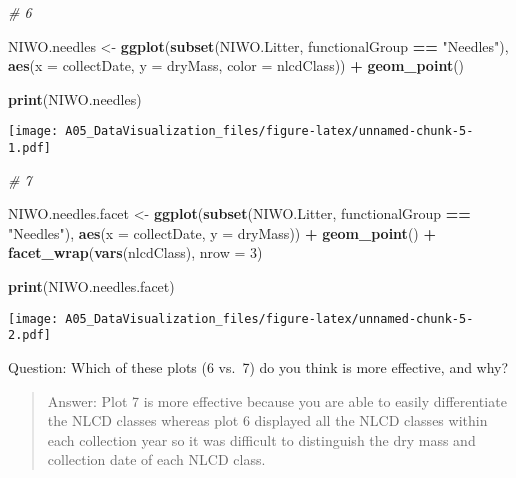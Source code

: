 \documentclass[]{article}
\newenvironment{Shaded}{\begin{snugshade}}{\end{snugshade}}
\newcommand{\KeywordTok}[1]{\textcolor[rgb]{0.13,0.29,0.53}{\textbf{#1}}}
\newcommand{\DataTypeTok}[1]{\textcolor[rgb]{0.13,0.29,0.53}{#1}}
\newcommand{\DecValTok}[1]{\textcolor[rgb]{0.00,0.00,0.81}{#1}}
\newcommand{\StringTok}[1]{\textcolor[rgb]{0.31,0.60,0.02}{#1}}
\newcommand{\CommentTok}[1]{\textcolor[rgb]{0.56,0.35,0.01}{\textit{#1}}}
\newcommand{\OperatorTok}[1]{\textcolor[rgb]{0.81,0.36,0.00}{\textbf{#1}}}
\newcommand{\NormalTok}[1]{#1}
\begin{document}
\begin{Shaded}
\begin{Highlighting}[]
\CommentTok{# 6}

\NormalTok{NIWO.needles <-}\StringTok{ }
\StringTok{  }\KeywordTok{ggplot}\NormalTok{(}\KeywordTok{subset}\NormalTok{(NIWO.Litter, functionalGroup }\OperatorTok{==}\StringTok{ "Needles"}\NormalTok{),}
         \KeywordTok{aes}\NormalTok{(}\DataTypeTok{x =}\NormalTok{ collectDate, }\DataTypeTok{y =}\NormalTok{ dryMass, }\DataTypeTok{color =}\NormalTok{ nlcdClass)) }\OperatorTok{+}
\StringTok{  }\KeywordTok{geom_point}\NormalTok{() }

 \KeywordTok{print}\NormalTok{(NIWO.needles)}
\end{Highlighting}
\end{Shaded}

\texttt{[image: A05\_DataVisualization\_files/figure-latex/unnamed-chunk-5-1.pdf]}

\begin{Shaded}
\begin{Highlighting}[]
\CommentTok{# 7}
 
\NormalTok{ NIWO.needles.facet <-}\StringTok{ }
\StringTok{   }\KeywordTok{ggplot}\NormalTok{(}\KeywordTok{subset}\NormalTok{(NIWO.Litter, functionalGroup }\OperatorTok{==}\StringTok{ "Needles"}\NormalTok{),}
         \KeywordTok{aes}\NormalTok{(}\DataTypeTok{x =}\NormalTok{ collectDate, }\DataTypeTok{y =}\NormalTok{ dryMass)) }\OperatorTok{+}
\StringTok{  }\KeywordTok{geom_point}\NormalTok{() }\OperatorTok{+}
\StringTok{   }\KeywordTok{facet_wrap}\NormalTok{(}\KeywordTok{vars}\NormalTok{(nlcdClass), }\DataTypeTok{nrow =} \DecValTok{3}\NormalTok{)}

  \KeywordTok{print}\NormalTok{(NIWO.needles.facet)}
\end{Highlighting}
\end{Shaded}

\texttt{[image: A05\_DataVisualization\_files/figure-latex/unnamed-chunk-5-2.pdf]}

Question: Which of these plots (6 vs.~7) do you think is more effective,
and why?

\begin{quote}
Answer: Plot 7 is more effective because you are able to easily
differentiate the NLCD classes whereas plot 6 displayed all the NLCD
classes within each collection year so it was difficult to distinguish
the dry mass and collection date of each NLCD class.
\end{quote}
\end{document}

